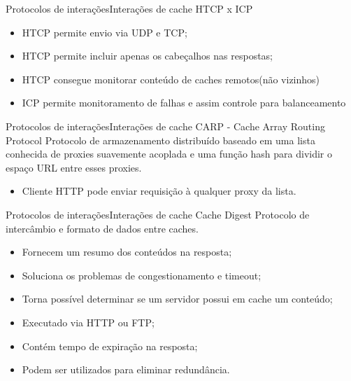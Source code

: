 \documentclass{beamer}
\begin{document}
\begin{frame}{Protocolos de intera\c{c}\~oes}{Intera\c{c}\~oes de cache}
HTCP x ICP
\begin{itemize}
\item HTCP permite envio via UDP e TCP;
\item HTCP permite incluir apenas os cabeçalhos nas respostas;
\item HTCP consegue monitorar conte\'udo de caches remotos(n\~ao vizinhos)
\item ICP permite monitoramento de falhas e assim controle para balanceamento
\end{itemize}
\end{frame}

\begin{frame}{Protocolos de intera\c{c}\~oes}{Intera\c{c}\~oes de cache}
CARP -  Cache Array Routing Protocol
Protocolo de armazenamento distribu\'ido baseado em uma lista conhecida de proxies suavemente acoplada e uma fun\c{c}\~ao hash para dividir o espa\c{c}o URL entre esses proxies.
\begin{itemize}
\item Cliente HTTP pode enviar requisi\c{c}\~ao \`a qualquer proxy da lista.
\end{itemize}
\end{frame}

\begin{frame}{Protocolos de intera\c{c}\~oes}{Intera\c{c}\~oes de cache}
Cache Digest
Protocolo de interc\^ambio e formato de dados entre caches.
\begin{itemize}
\item Fornecem um resumo dos conte\'udos na resposta;
\item Soluciona os problemas de congestionamento e timeout;
\item Torna poss\'ivel determinar se um servidor possui em cache um conte\'udo;
\item Executado via HTTP ou FTP;
\item Cont\'em tempo de expira\c{c}\~ao na resposta;
\item Podem ser utilizados para eliminar redund\^ancia.
\end{itemize}
\end{frame}
\end{document}
